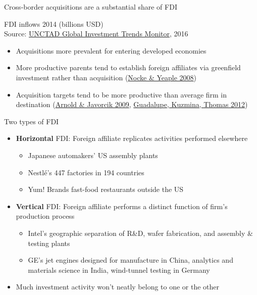 \documentclass[11pt,notes=hide,aspectratio=169]{beamer}
\begin{document}
\begin{frame}{Cross-border acquisitions are a substantial share of FDI}
\vspace{-3mm}  
\begin{center}
\footnotesize{FDI inflows 2014 (billions USD)}
\resizebox{0.8\textwidth}{!}{}\\
\footnotesize{Source: \href{http://unctad.org/en/PublicationsLibrary/webdiaeia2016d1_en.pdf}{UNCTAD Global Investment Trends Monitor}, 2016}
\end{center}
\vspace{-3mm}
\begin{itemize}
	\item Acquisitions more prevalent for entering developed economies
	\item More productive parents tend to establish foreign affiliates via greenfield investment rather than acquisition {\footnotesize (\href{http://restud.oxfordjournals.org.proxy.uchicago.edu/content/75/2/529.abstract}{Nocke \& Yeaple 2008})}
	\item Acquisition targets tend to be more productive than average firm in destination {\footnotesize (\href{http://www.sciencedirect.com.proxy.uchicago.edu/science/article/pii/S0022199609000695}{Arnold \& Javorcik 2009}, \href{https://www-aeaweb-org.proxy.uchicago.edu/articles.php?doi=10.1257/aer.102.7.3594}{Guadalupe, Kuzmina, Thomas 2012})}
\end{itemize}
\end{frame}
\begin{frame}{Two types of FDI}
\begin{itemize}
	\item \textbf{Horizontal} FDI: Foreign affiliate replicates activities performed elsewhere
	\begin{itemize}
	\item Japanese automakers' US assembly plants
	\item Nestl\'{e}'s 447 factories in 194 countries
	\item Yum! Brands fast-food restaurants outside the US
	\end{itemize}
	\item \textbf{Vertical} FDI: Foreign affiliate performs a distinct function of firm's production process
	\begin{itemize}
	\item Intel's geographic separation of R\&D, wafer fabrication, and assembly \& testing plants
	\item GE's jet engines designed for manufacture in China, analytics and materials science in India, wind-tunnel testing in Germany
	\end{itemize}
	\item Much investment activity won't neatly belong to one or the other
\end{itemize}
\end{frame}
\end{document}
